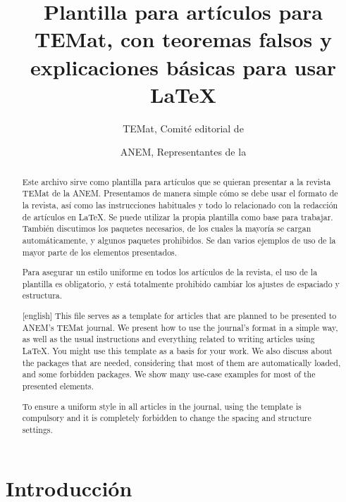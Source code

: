 \documentclass{TEMat-article}
\title[Plantilla para artículos para TEMat]{Plantilla para artículos para TEMat, con teoremas falsos y explicaciones básicas para usar \LaTeX{}}
\author*{TEMat, Comité editorial de}
\affiliation{Asociación Nacional de Estudiantes de Matemáticas (ANEM)}
\author{ANEM, Representantes de la}
\affiliation{Asociación Nacional de Estudiantes de Matemáticas (ANEM)}
\begin{document}
\begin{abstract}
Este archivo sirve como plantilla para artículos que se quieran presentar a la revista TEMat de la ANEM.
Presentamos de manera simple cómo se debe usar el formato de la revista, así como las instrucciones habituales y todo lo relacionado con la redacción de artículos en \LaTeX.
Se puede utilizar la propia plantilla como base para trabajar.
También discutimos los paquetes necesarios, de los cuales la mayoría se cargan automáticamente, y algunos paquetes prohibidos.
Se dan varios ejemplos de uso de la mayor parte de los elementos presentados.

Para asegurar un estilo uniforme en todos los artículos de la revista, el uso de la plantilla es obligatorio, y está totalmente prohibido cambiar los ajustes de espaciado y estructura.
\end{abstract}
\begin{abstract}[english]
This file serves as a template for articles that are planned to be presented to ANEM's TEMat journal.
We present how to use the journal's format in a simple way, as well as the usual instructions and everything related to writing articles using \LaTeX.
You might use this template as a basis for your work.
We also discuss about the packages that are needed, considering that most of them are automatically loaded, and some forbidden packages.
We show many use-case examples for most of the presented elements.

To ensure a uniform style in all articles in the journal, using the template is compulsory and it is completely forbidden to change the spacing and structure settings.
\end{abstract}
\maketitle

\section{Introducción}
\end{document}
